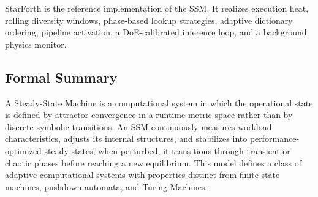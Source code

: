 StarForth is the reference implementation of the SSM. It realizes execution heat,
rolling diversity windows, phase-based lookup strategies, adaptive dictionary
ordering, pipeline activation, a DoE-calibrated inference loop, and a background
physics monitor.

\subsection{Formal Summary}

A Steady-State Machine is a computational system in which the operational state is
defined by attractor convergence in a runtime metric space rather than by
discrete symbolic transitions. An SSM continuously measures workload
characteristics, adjusts its internal structures, and stabilizes into
performance-optimized steady states; when perturbed, it transitions through
transient or chaotic phases before reaching a new equilibrium. This model defines
a class of adaptive computational systems with properties distinct from finite
state machines, pushdown automata, and Turing Machines.
